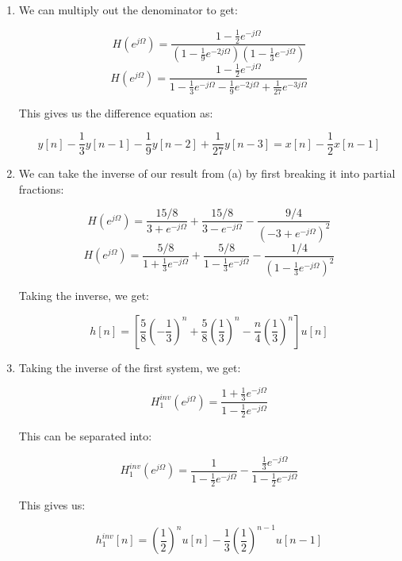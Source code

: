 \begin{enumerate}
\begin{enumerate}
      \item 
        
        We can multiply out the denominator to get:

        $$H(e^{j\Omega})=\frac{1-\frac{1}{2}e^{-j\Omega}}{\left( 1-\frac{1}{9}e^{-2j\Omega} \right)\left( 1-\frac{1}{3}e^{-j\Omega} \right)}$$
        $$H(e^{j\Omega})=\frac{1-\frac{1}{2}e^{-j\Omega}}{1-\frac{1}{3}e^{-j\Omega} -\frac{1}{9}e^{-2j\Omega}+\frac{1}{27}e^{-3j\Omega}}$$

        This gives us the difference equation as:

        $$\boxed{y[n]-\frac{1}{3}y[n-1]-\frac{1}{9}y[n-2]+\frac{1}{27}y[n-3]=x[n]-\frac{1}{2}x[n-1]}$$

      \item We can take the inverse of our result from (a) by first breaking it into partial fractions:

        $$H(e^{j\Omega})=\frac{15/8}{3+e^{-j\Omega}}+\frac{15/8}{3-e^{-j\Omega}}-\frac{9/4}{(-3+e^{-j\Omega})^2}$$
        $$H(e^{j\Omega})=\frac{5/8}{1+\frac{1}{3}e^{-j\Omega}}+\frac{5/8}{1-\frac{1}{3}e^{-j\Omega}}-\frac{1/4}{(1-\frac{1}{3}e^{-j\Omega})^2}$$

        Taking the inverse, we get:

        $$\boxed{h[n]=\left[\frac{5}{8}\left( -\frac{1}{3} \right)^{n}+\frac{5}{8}\left( \frac{1}{3} \right)^{n}-\frac{n}{4}\left( \frac{1}{3} \right)^n\right]u[n]}$$

      \item Taking the inverse of the first system, we get:

        $$H_1^{inv}(e^{j\Omega})=\frac{1+\frac{1}{3}e^{-j\Omega}}{1-\frac{1}{2}e^{-j\Omega}}$$

        This can be separated into:

        $$\boxed{H_1^{inv}(e^{j\Omega})=\frac{1}{1-\frac{1}{2}e^{-j\Omega}}-\frac{\frac{1}{3}e^{-j\Omega}}{1-\frac{1}{2}e^{-j\Omega}}}$$

        This gives us:

        $$\boxed{h_1^{inv}[n]=\left( \frac{1}{2} \right)^nu[n]-\frac{1}{3}\left( \frac{1}{2} \right)^{n-1}u[n-1]}$$

    \end{enumerate}

\end{enumerate}




